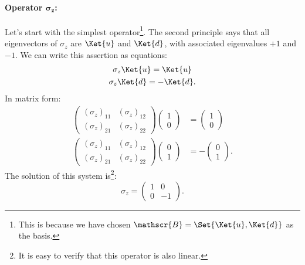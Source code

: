 \paragraph{Operator $\boldsymbol{\sigma_z}$:} Let's start with the simplest operator\footnote{This is because we have chosen $\mathscr{B} = \Set{\Ket{u}, \Ket{d}}$ as the basis.}. The second principle says that all eigenvectors of $\sigma_z$ are $\Ket{u}$ and $\Ket{d}$, with associated eigenvalues $+1$ and $-1$. We can write this assertion as equations:
\begin{gather*}
	\sigma_z \Ket{u} = \Ket{u}  \\
	\sigma_z \Ket{d} = -\Ket{d}.
\end{gather*}
In matrix form:
\begin{align*}
	\begin{pmatrix}
		(\sigma_z)_{11} &  (\sigma_z)_{12}\\
		(\sigma_z)_{21} &  (\sigma_z)_{22}
	\end{pmatrix} 
	\begin{pmatrix}
		1\\
		0
	\end{pmatrix} &= 
	\begin{pmatrix}
		1\\
		0
	\end{pmatrix}\\
	\begin{pmatrix}
		(\sigma_z)_{11} &  (\sigma_z)_{12}\\
		(\sigma_z)_{21} &  (\sigma_z)_{22}
	\end{pmatrix} 
	\begin{pmatrix}
		0\\
		1
	\end{pmatrix} &= -
	\begin{pmatrix}
		0\\
		1
	\end{pmatrix}.
\end{align*}
The solution of this system is\footnote{It is easy to verify that this operator is also linear.}:
\[
\sigma_z = 
\begin{pmatrix}
	1 & 0\\
	0 & -1
\end{pmatrix}.
\label{eqn:obs_z}
\]

